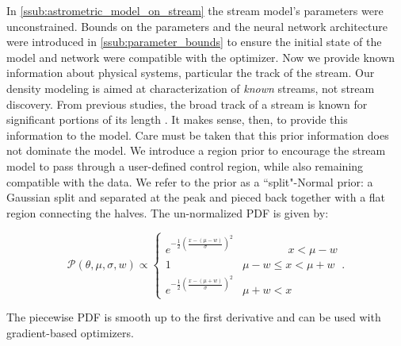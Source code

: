 \documentclass[twocolumn]{aastex631}
\newcommand{\mcal}[1]{\mathcal{#1}}
\newcommand{\Exp}[1]{e^{#1}}
\newcommand{\pdf}{\mcal{P}}
\begin{document}
            In \autoref{ssub:astrometric_model_on_stream} the stream model's parameters were unconstrained. Bounds on the parameters and the neural network architecture were introduced in \autoref{ssub:parameter_bounds} to ensure the initial state of the model and network were compatible with the optimizer. Now we provide known information about physical systems, particular the track of the stream.
            Our density modeling is aimed at characterization of \textit{known} streams, not stream discovery. From previous studies, the broad track of a
            stream is known for significant portions of its length \citep[e.g. see the atlas in][]{Mateu2022}. It makes sense, then, to provide this information to the model. Care must be taken that this prior information does not dominate the model.
            We introduce a region prior to encourage the stream model to pass through a user-defined control region, while also remaining compatible with the data.
            We refer to the prior as a ``split"-Normal prior: a Gaussian split and separated at the peak and pieced back together with a flat region connecting the halves. The un-normalized PDF is given by:
            \begin{small}
            \begin{equation}
                \pdf(\theta,\mu,\sigma,w) \propto \begin{cases} 
                   \Exp{-\frac{1}{2}\left(\frac{x-(\mu-w)}{\sigma}\right)^2} & \phantom{\mu - w <}\ x < \mu - w \\
                    1 & \mu - w \leq x < \mu + w \\
                    \Exp{-\frac{1}{2}\left(\frac{x-(\mu+w)}{\sigma}\right)^2} & \mu + w < x
                \end{cases}.
            \end{equation}\end{small}
            The piecewise PDF is smooth up to the first derivative and can be used with gradient-based optimizers.
\end{document}
